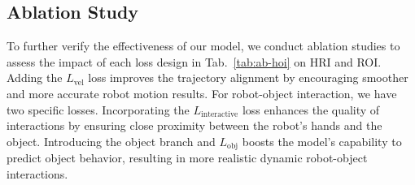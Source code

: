 \subsection{Ablation Study}
To further verify the effectiveness of our model, we conduct ablation studies to assess the impact of each loss design in Tab.~\ref{tab:ab-hoi} on HRI and ROI. Adding the $L_{\text{vel}}$ loss improves the trajectory alignment by encouraging smoother and more accurate robot motion results. For robot-object interaction, we have two specific losses. Incorporating the $L_{\text{interactive}}$ loss enhances the quality of interactions by ensuring close proximity between the robot's hands and the object. Introducing the object branch and $L_{\text{obj}}$ boosts the model's capability to predict object behavior, resulting in more realistic dynamic robot-object interactions.








